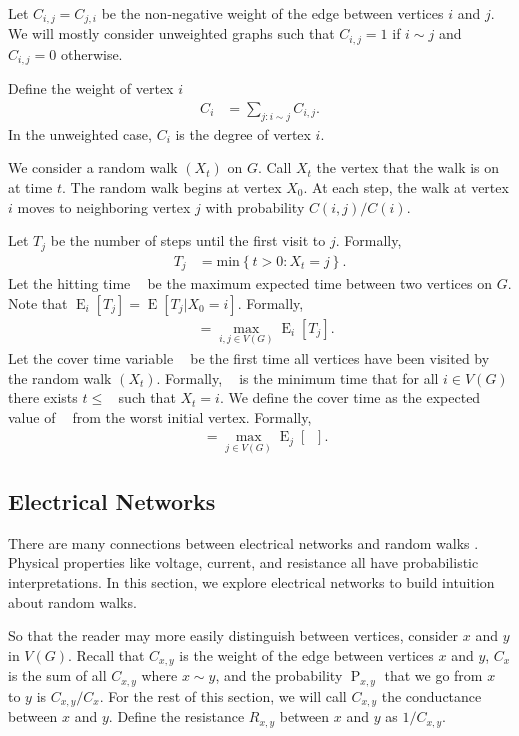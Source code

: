 \documentclass[12pt]{article}
\theoremstyle{definition}
\DeclareMathOperator{\E}{\mathrm{E}}		     %
\DeclareMathOperator{\pr}{\mathrm{P}}		     %
\DeclareMathOperator{\cov}{\uptau_\textrm{cov}}  %
\DeclareMathOperator{\tcov}{t_\textrm{cov}}      %
\DeclareMathOperator{\hit}{t_{\textrm{hit}}}     %
\begin{document}
Let $C_{i,j}=C_{j,i}$ be the non-negative weight of the edge between vertices $i$ and $j$.
We will mostly consider unweighted graphs
such that $C_{i,j} = 1$ if $i \sim j$ and $C_{i,j} = 0$ otherwise.

Define the weight of vertex $i$ 
\begin{align}
C_i &= \sum_{j:i \sim j} C_{i,j}. \nonumber
\end{align}
In the unweighted case, $C_i$ is the degree of vertex $i$.

We consider a random walk $(X_t)$ on $G$.
Call $X_t$ the vertex that the walk is on at time $t$.
The random walk begins at vertex $X_0$.
At each step, the walk at vertex $i$ moves to neighboring vertex
$j$ with probability $C(i,j)/C(i)$.

Let $T_{j}$ be the number of steps until the first visit to $j$.
Formally,
\begin{align}
T_{j} &= \textrm{min} \left\{t > 0 : X_t = j \right\}. \nonumber
\end{align}
Let the hitting time $\hit$ be the maximum expected time between two vertices on $G$.
Note that $\E_i[T_j] = \E[T_j | X_0 = i]$.
Formally, 
\begin{align}
\hit &= \max_{i,j \in V(G)} \E_i[T_j]. \nonumber
\end{align}
Let the cover time variable $\cov$ be the first time all vertices have been
visited by the random walk $(X_t)$.
Formally, $\cov$ is the minimum time that for all $i \in V(G)$
there exists $t \leq \cov$ such that $X_t = i$.
We define the cover time as the expected value of $\cov$ from
the worst initial vertex.
Formally,
\begin{align}
\tcov &= \max_{j \in V(G)} \E_j[\cov] . \nonumber
\end{align}

\subsection{Electrical Networks \label{sec:electric}}

There are many connections between electrical networks
and random walks \cite{Bo98}.
Physical properties like voltage, current, and resistance
all have probabilistic interpretations.
In this section, we explore electrical networks to build intuition about 
random walks.

So that the reader may more easily distinguish between
vertices, consider $x$ and $y$ in $V(G)$.
Recall that $C_{x,y}$ is the weight of the edge
between vertices $x$ and $y$, $C_x$ is the sum
of all $C_{x,y}$ where $x \sim y$, and the probability $\pr_{x,y}$
that we go from $x$ to $y$ is $C_{x,y}/C_x$.
For the rest of this section, we will call $C_{x,y}$
the conductance between $x$ and $y$.
Define the resistance $R_{x,y}$ between $x$ and $y$
as $1/ C_{x,y}$.
\end{document}
